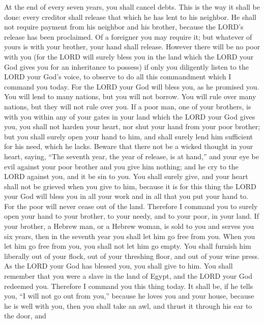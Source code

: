 \mychapter{} \myverse*{}At the end of every seven years, you shall cancel debts.
\myverse{}This is the way it shall be done: every creditor shall release that which he
has lent to his neighbor. He shall not require payment from his neighbor and his brother, because the
LORD’s release has been proclaimed.
\myverse{}Of a foreigner you may require it; but whatever of yours is with your brother,
your hand shall release.
\myverse{}However there will be no poor with you (for the LORD will surely bless you
in the land which the LORD your God gives you for an inheritance to possess)
\myverse{}if only you diligently listen to the LORD your God’s voice, to observe to do
all this commandment which I command you today.
\myverse{}For the LORD your God will bless you, as he promised you. You will lend to
many nations, but you will not borrow. You will rule over many nations, but they will not rule over you.
\myverse{}If a poor man, one of your brothers, is with you within any of your gates in
your land which the LORD your God gives you, you shall not harden your heart, nor shut your hand from
your poor brother;
\myverse{}but you shall surely open your hand to him, and shall surely lend him sufficient
for his need, which he lacks.
\myverse{}Beware that there not be a wicked thought in your heart, saying, “The seventh
year, the year of release, is at hand,” and your eye be evil against your poor brother and you give him
nothing; and he cry to the LORD against you, and it be sin to you.
\myverse{}You shall surely give, and your heart shall not be grieved when you give
to him, because it is for this thing the LORD your God will bless you in all your work and in all that
you put your hand to.
\myverse{}For the poor will never cease out of the land. Therefore I command you to
surely open your hand to your brother, to your needy, and to your poor, in your land.
\myverse{}If your brother, a Hebrew man, or a Hebrew woman, is sold to you and serves
you six years, then in the seventh year you shall let him go free from you.
\myverse{}When you let him go free from you, you shall not let him go empty.
\myverse{}You shall furnish him liberally out of your flock, out of your threshing
floor, and out of your wine press. As the LORD your God has blessed you, you shall give to him.
\myverse{}You shall remember that you were a slave in the land of Egypt, and the LORD
your God redeemed you. Therefore I command you this thing today.
\myverse{}It shall be, if he tells you, “I will not go out from you,” because he loves
you and your house, because he is well with you,
\myverse{}then you shall take an awl, and thrust it through his ear to the door, and

